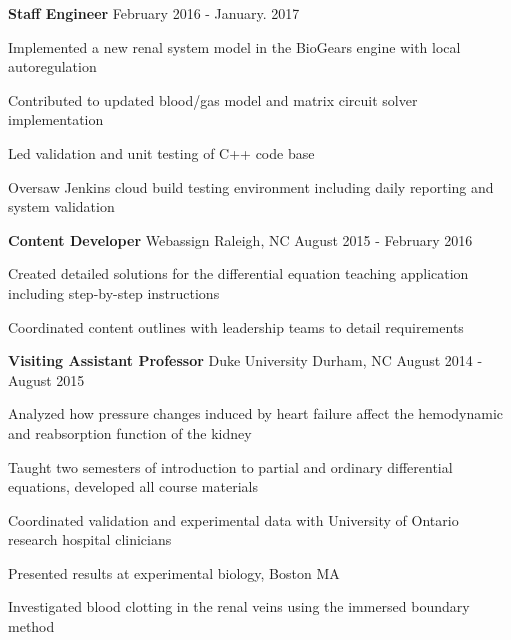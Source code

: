 \begin{cventries}
  \cventry
    {\textbf{Staff Engineer}}%
    {} %
    {} %
    {February 2016 - January. 2017} %
    {
      \begin{cvitems} %
        \item {Implemented a new renal system model in the BioGears engine with local autoregulation}
        \item {Contributed to updated blood/gas model and matrix circuit solver implementation}
        \item {Led validation and unit testing of C++ code base}
        \item {Oversaw Jenkins cloud build testing environment including daily reporting and system validation}
      \end{cvitems}
    }

  \cventry
    {\textbf{Content Developer}} %
    {Webassign} %
    {Raleigh, NC} %
    {August 2015 - February 2016} %
    {
      \begin{cvitems} %
        \item {Created detailed solutions for the differential equation teaching application including step-by-step instructions}
        \item {Coordinated content outlines with leadership teams to detail requirements}
      \end{cvitems}
    }

  \cventry
    {\textbf{Visiting Assistant Professor}} %
    {Duke University} %
    {Durham, NC} %
    {August 2014 - August 2015} %
    {
      \begin{cvitems} %
        \item {Analyzed how pressure changes induced by heart failure affect the hemodynamic and reabsorption
function of the kidney}
		    \item {Taught two semesters of introduction to partial and ordinary differential equations, developed all course materials}
        \item {Coordinated validation and experimental data with University of Ontario research hospital clinicians}
        \item {Presented results at experimental biology, Boston MA}
        \item {Investigated blood clotting in the renal veins using the immersed boundary method}
      \end{cvitems}
    }


\end{cventries}
